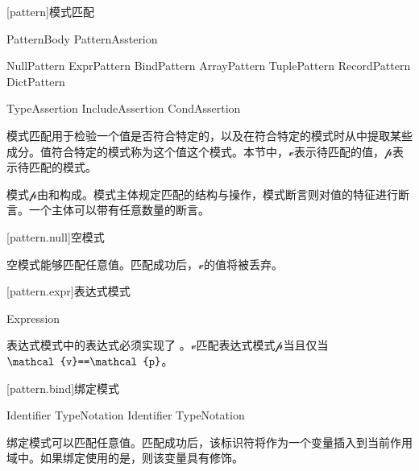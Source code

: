 
[pattern]{模式匹配}

\begin{bnf}
 \br
    PatternBody PatternAssterion\bnfs
\end{bnf}

\begin{bnf}
 \br
    NullPattern \br
    ExprPattern \br
    BindPattern \br
    ArrayPattern \br
    TuplePattern \br
    RecordPattern \br
    DictPattern \br
\end{bnf}

\begin{bnf}
    TypeAssertion
    IncludeAssertion
    CondAssertion
\end{bnf}

\pnum
模式匹配用于检验一个值是否符合特定的，以及在符合特定的模式时从中提取某些成分。值符合特定的模式称为这个值这个模式。本节中，$\mathcal{v}$表示待匹配的值，$\mathcal{p}$表示待匹配的模式。

\pnum
模式$\mathcal{p}$由和构成。模式主体规定匹配的结构与操作，模式断言则对值的特征进行断言。一个主体可以带有任意数量的断言。

[pattern.null]{空模式}

\begin{bnf}
 \br
    \tcode{_}
\end{bnf}

\pnum
空模式能够匹配任意值。匹配成功后，$\mathcal{v}$的值将被丢弃。

[pattern.expr]{表达式模式}

\begin{bnf}
 \br
    Expression
\end{bnf}

\pnum
表达式模式中的表达式必须实现了 。$\mathcal{v}$匹配表达式模式$\mathcal{p}$当且仅当$\mathcal{v}\tcode{==}\mathcal{p}$。

[pattern.bind]{绑定模式}

\begin{bnf}
 \br
     Identifier TypeNotation\bnfq \br
     Identifier TypeNotation\bnfq
\end{bnf}

\pnum
绑定模式可以匹配任意值。匹配成功后，该标识符将作为一个变量插入到当前作用域中。如果绑定使用的是，则该变量具有修饰。


